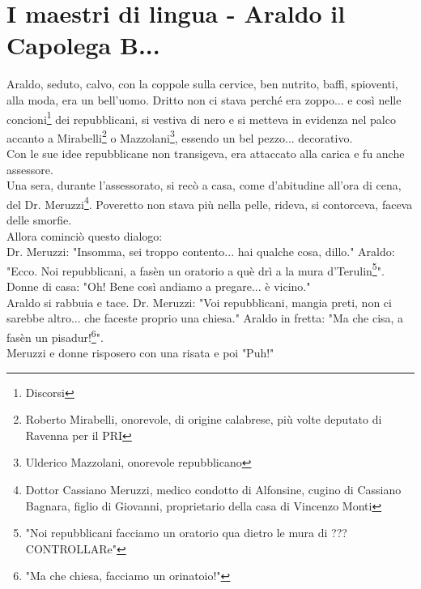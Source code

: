 
\chapter{I maestri di lingua - Araldo il Capolega B...}
Araldo, seduto, calvo, con la coppole sulla cervice, ben nutrito, baffi, spioventi, alla moda, era un bell'uomo. Dritto non ci stava perché era zoppo... e così nelle concioni\footnote{Discorsi} dei repubblicani, si vestiva di nero e si metteva in evidenza nel palco accanto a Mirabelli\footnote{Roberto Mirabelli, onorevole, di origine calabrese, più volte deputato di Ravenna per il PRI} o Mazzolani\footnote{Ulderico Mazzolani, onorevole repubblicano}, essendo un bel pezzo... decorativo.\\
Con le sue idee repubblicane non transigeva, era attaccato alla carica e fu anche assessore.\\
Una sera, durante l'assessorato, si recò a casa, come d'abitudine all'ora di cena, del Dr. Meruzzi\footnote{Dottor Cassiano Meruzzi, medico condotto di Alfonsine, cugino di Cassiano Bagnara, figlio di Giovanni, proprietario della casa di Vincenzo Monti}. Poveretto non stava più nella pelle, rideva, si contorceva, faceva delle smorfie.\\
Allora cominciò questo dialogo:\\
Dr. Meruzzi: "Insomma, sei troppo contento... hai qualche cosa, dillo."
Araldo: "Ecco. Noi repubblicani, a fasèn un oratorio a què drì a la mura d'Terulin\footnote{"Noi repubblicani facciamo un oratorio qua dietro le mura di ??? CONTROLLARe"}".\\
Donne di casa: "Oh! Bene così andiamo a pregare... è vicino."\\
Araldo si rabbuia e tace. 
Dr. Meruzzi: "Voi repubblicani, mangia preti, non ci sarebbe altro... che faceste proprio una chiesa."
Araldo in fretta: "Ma che cisa, a fasèn un pisadur!\footnote{"Ma che chiesa, facciamo un orinatoio!"}".\\
Meruzzi e donne risposero con una risata e poi "Puh!"\\
